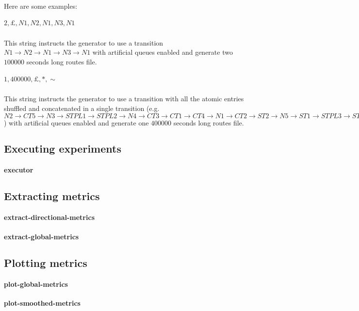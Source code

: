 Here are some examples:

\subparagraph{$2,\pounds,N1,N2,N1,N3,N1$}
This string instructs the generator to use a transition $N1 \rightarrow N2 \rightarrow N1 \rightarrow N3 \rightarrow N1$ with artificial queues enabled and generate two $100000$ seconds long routes file.

\subparagraph{$1,400000,\pounds,*,\sim$}
This string instructs the generator to use a transition with all the atomic entries shuffled and concatenated in a single transition (e.g. $N2 \rightarrow CT5 \rightarrow N3 \rightarrow STPL1 \rightarrow STPL2 \rightarrow N4 \rightarrow CT3 \rightarrow CT1 \rightarrow CT4 \rightarrow N1 \rightarrow CT2 \rightarrow ST2 \rightarrow N5 \rightarrow ST1 \rightarrow STPL3 \rightarrow ST3$) with artificial queues enabled and generate one $400000$ seconds long routes file.

\subsection{Executing experiments}

\paragraph{executor}

\subsection{Extracting metrics}

\paragraph{extract-directional-metrics}
\paragraph{extract-global-metrics}

\subsection{Plotting metrics}

\paragraph{plot-global-metrics}
\paragraph{plot-smoothed-metrics}
